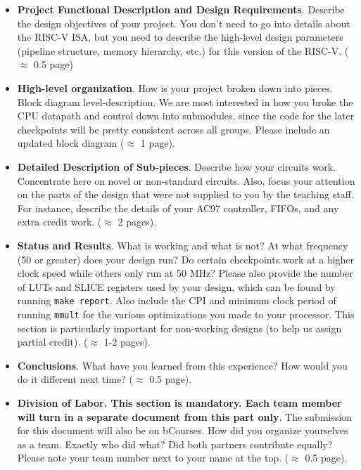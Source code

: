 \documentclass[11pt]{article}
\begin{document}
\begin{itemize}
	\item \textbf{Project Functional Description and Design Requirements}. Describe the design 	objectives of your project.  You don't need to go into details about the RISC-V ISA, but you need to describe the high-level design parameters (pipeline structure, memory hierarchy, etc.) for this version of the RISC-V. ($\approx$ 0.5 page)
	
	\item \textbf{High-level organization}. How is your project broken down into pieces. Block diagram level-description. We are most interested in how you broke the CPU datapath and control
	down into submodules, since the code for the later checkpoints will be pretty consistent 	across all groups. Please include an updated block diagram ($\approx$ 1 page).
	
	\item \textbf{Detailed Description of Sub-pieces}. Describe how your circuits work. Concentrate here on novel or non-standard circuits. Also, focus your attention on the parts of the	design that were not supplied to you by the teaching staff. For instance, describe the details of your AC97 controller, FIFOs, and any extra credit work. ($\approx$ 2 pages).
	
	\item \textbf{Status and Results}. What is working and what is not? At what frequency (50 or greater) does your design run? Do certain checkpoints work at a higher clock speed while others only	run at 50 MHz? Please also provide the number of LUTs and SLICE registers used by your design, which can be found by running \verb|make report|. Also include the CPI and minimum clock period of running \verb|mmult| for the various optimizations you made to your processor. This section is particularly important for non-working designs (to help us assign partial credit). ($\approx$ 1-2 pages).
	
	\item \textbf{Conclusions}. What have you learned from this experience? How would you do it different next time? ($\approx$ 0.5 page).
	
	\item \textbf{Division of Labor. This section is mandatory. Each team member will turn in a separate document from this part only}. The submission for this document will also be on bCourses. How did you organize yourselves as a team. Exactly who did what? Did both partners contribute equally? Please note your team number next to your name at the top. ($\approx$ 0.5 page).
\end{itemize}
\end{document}
